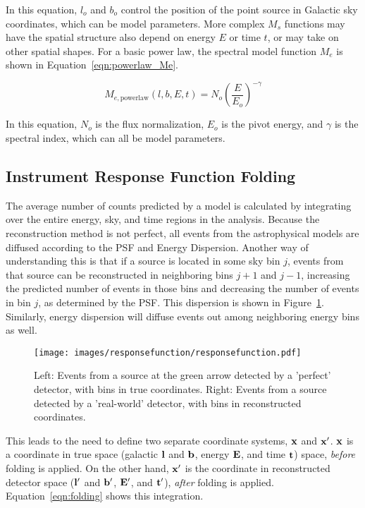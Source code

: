   In this equation, $l_o$ and $b_o$ control the position of the point source in Galactic sky coordinates, which can be model parameters.
  More complex $M_s$ functions may have the spatial structure also depend on energy $E$ or time $t$, or may take on other spatial shapes.
  For a basic power law, the spectral model function $M_e$ is shown in Equation~\ref{eqn:powerlaw_Me}.
  
  \begin{equation}\label{eqn:powerlaw_Me}
    M_{e,\textrm{powerlaw}}(l,b,E,t) = N_o \left ( \frac{E}{E_o} \right )^{-\gamma}
  \end{equation}

  In this equation, $N_o$ is the flux normalization, $E_o$ is the pivot energy, and $\gamma$ is the spectral index, which can all be model parameters.

  
  \subsection{Instrument Response Function Folding}\label{subsec:folding}
  The average number of counts predicted by a model is calculated by integrating over the entire energy, sky, and time regions in the analysis.
  Because the reconstruction method is not perfect, all events from the astrophysical models are diffused according to the PSF and Energy Dispersion.
  Another way of understanding this is that if a source is located in some sky bin $j$, events from that source can be reconstructed in neighboring bins $j+1$ and $j-1$, increasing the predicted number of events in those bins and decreasing the number of events in bin $j$, as determined by the PSF.
  This dispersion is shown in Figure~\ref{fig:responsedispersion}.
  Similarly, energy dispersion will diffuse events out among neighboring energy bins as well.
  
  \begin{figure}[h]
    \centering
    \texttt{[image: images/responsefunction/responsefunction.pdf]}
    \caption[Response Function Dispersion]
    {
      Left: Events from a source at the green arrow detected by a 'perfect' detector, with bins in true coordinates.
      Right: Events from a source detected by a 'real-world' detector, with bins in reconstructed coordinates.
    }
    \label{fig:responsedispersion}
  \end{figure}
  
  This leads to the need to define two separate coordinate systems, $\mathbf{x }$ and $\mathbf{x'}$.
  $\mathbf{x }$ is a coordinate in true space (galactic $\mathbf{l }$ and $\mathbf{b }$, energy $\mathbf{E }$, and time $\mathbf{t }$) space, \textit{before} folding is applied.
  On the other hand, $\mathbf{x'}$ is the coordinate in reconstructed detector space ($\mathbf{l'}$ and $\mathbf{b'}$, $\mathbf{E'}$, and $\mathbf{t'}$), \textit{after} folding is applied.
  Equation~\ref{eqn:folding} shows this integration.
  
